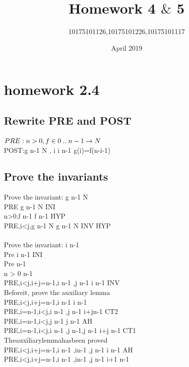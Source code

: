 \documentclass[11pt,a4paper,fleqn]{article}
\title{Homework 4 $\&$ 5}
\author{10175101126,10175101226,10175101117}
\date{April 2019}
\begin{document}
\maketitle

\section{ homework 2.4 }
\subsection{Rewrite PRE and POST }
\noindent
$ PRE: n > 0,f\in 0 \mathbin{.\mkern1mu.} n-1 \rightarrow N $\\
POST:g  \upto n-1 \rightarrow N , \forall i \cdot i  \upto n-1 \Rightarrow g(i)=f(n-i-1) \\



\subsection{Prove the invariants}
\noindent
Prove the invariant: g  \upto n-1 \rightarrow N \\
PRE \vdash [g:=f] g  \upto n-1 \rightarrow N \quad INI \\
n>0,f  \upto n-1 \vdash f  \upto n-1 \quad HYP \\
PRE,i<j,g  \upto n-1 \rightarrow N \vdash [g :=(\{i, j\} \domsub g) \cup\{i \mapsto g(j), j \mapsto g(i)\}]g  \upto n-1 \rightarrow N \quad INV \quad HYP\\
\noindent
\\
Prove \; the \; invariant: i  \upto n-1 \\
Pre \vdash [i:=0]i  \upto n-1 \quad INI \\
Pre   \upto n-1 \\
n > 0   \upto n-1 \quad \\
PRE,i<j,i+j=n-1,i \upto n-1 ,j \upto n-1 \vdash [i:=i+1]i \upto n-1 \; INV \\
Before\;it, \; prove \; the \; auxiliary \; lemma \; \\
PRE,i<j,i+j=n-1,i \upto n-1  \vdash i \neq n-1 \\
PRE,i=n-1,i<j,i  \upto n-1 ,j  \upto n-1 \vdash i+j\neq n-1 \;CT2 \\
PRE,i=n-1,i<j,j  \upto n-1 \vdash j  \upto n-1 \;AH \\
PRE,i=n-1,i<j,i  \upto n-1 ,j  \upto n-1,j  \upto n-1 \vdash i+j \neq n-1 \;CT1 \\
The\;auxiliary\;lemma\;has\;been\; proved \\
PRE,i<j,i+j=n-1,i \upto n-1 ,i\neq n-1 ,j \upto n-1 \vdash [i:=i+1]i \upto n-1 \; AH \\
PRE,i<j,i+j=n-1,i \upto n-1 ,i\neq n-1 ,j \upto n-1 \vdash i+1  \upto n-1 \\
\end{document}
